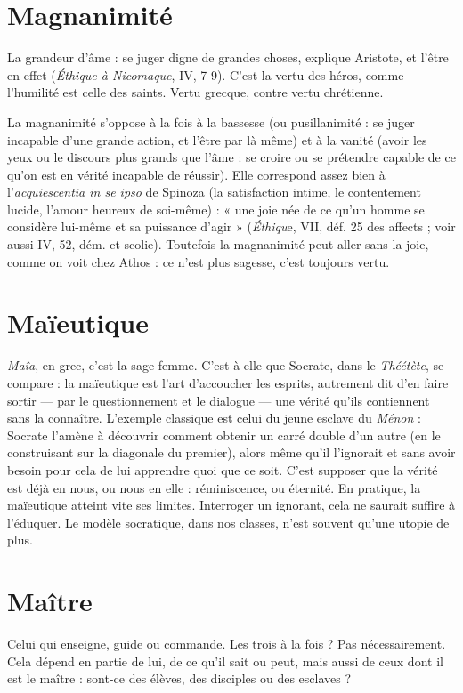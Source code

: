 \section{Magnanimité}
La grandeur d'âme : se juger digne de grandes choses,
explique Aristote, et l’être en effet ({\it Éthique à Nicomaque},
IV, 7-9). C’est la vertu des héros, comme l’humilité est celle des saints. Vertu
grecque, contre vertu chrétienne.

La magnanimité s’oppose à la fois à la bassesse (ou pusillanimité : se juger
incapable d’une grande action, et l’être par là même) et à la vanité (avoir les
yeux ou le discours plus grands que l’âme : se croire ou se prétendre capable de
ce qu'on est en vérité incapable de réussir). Elle correspond assez bien à
l’{\it acquiescentia in se ipso} de Spinoza (la satisfaction intime, le contentement
lucide, l'amour heureux de soi-même) : « une joie née de ce qu’un homme se
considère lui-même et sa puissance d’agir » ({\it Éthiqu}e, VII, déf. 25 des affects ;
voir aussi IV, 52, dém. et scolie). Toutefois la magnanimité peut aller sans la
joie, comme on voit chez Athos : ce n’est plus sagesse, c’est toujours vertu.

\section{Maïeutique}
{\it Maîa}, en grec, c’est la sage femme. C’est à elle que Socrate,
dans le {\it Théétète}, se compare : la maïeutique est l’art
d’accoucher les esprits, autrement dit d’en faire sortir — par le questionnement
et le dialogue — une vérité qu’ils contiennent sans la connaître. L'exemple classique
est celui du jeune esclave du {\it Ménon} : Socrate l’amène à découvrir comment
obtenir un carré double d’un autre (en le construisant sur la diagonale du
premier), alors même qu’il l’ignorait et sans avoir besoin pour cela de lui
apprendre quoi que ce soit. C’est supposer que la vérité est déjà en nous, ou
nous en elle : réminiscence, ou éternité.
En pratique, la maïeutique atteint vite ses limites. Interroger un ignorant,
cela ne saurait suffire à l’éduquer. Le modèle socratique, dans nos classes, n’est
souvent qu’une utopie de plus.

\section{Maître}
Celui qui enseigne, guide ou commande. Les trois à la fois ? Pas
nécessairement. Cela dépend en partie de lui, de ce qu’il sait ou
peut, mais aussi de ceux dont il est le maître : sont-ce des élèves, des disciples
ou des esclaves ?

